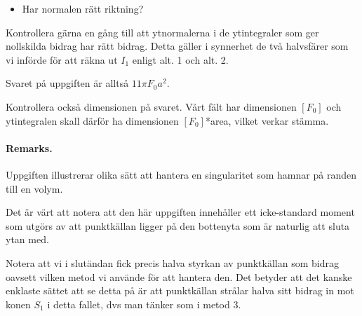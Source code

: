 \documentclass[%
oneside,                 %
final,                   %
10pt]{article}
\newenvironment{doconceexercise}{}{}
\begin{document}
\begin{doconceexercise}
\begin{itemize}
\item Har normalen rätt riktning?
\end{itemize}

\noindent
Kontrollera gärna en gång till att ytnormalerna i de ytintegraler som ger nollskilda bidrag har rätt bidrag. Detta gäller i synnerhet de två halvsfärer som vi införde för att räkna ut $I_1$ enligt alt. 1 och alt. 2.

Svaret på uppgiften är alltså $11\pi F_0 a^2$.

Kontrollera också dimensionen på svaret. Vårt fält har dimensionen $[F_0]$ och ytintegralen skall därför ha dimensionen $[F_0]$*area, vilket verkar stämma.



\paragraph{Remarks.}
Uppgiften illustrerar olika sätt att hantera en singularitet som hamnar på randen till en volym.

Det är värt att notera att den här uppgiften innehåller ett icke-standard moment som utgörs av att punktkällan ligger på den bottenyta som är naturlig att sluta ytan med. 

Notera att vi i slutändan fick precis halva styrkan 
av punktkällan som bidrag oavsett vilken metod vi använde för att hantera den. Det betyder att det kanske enklaste sättet att se detta på är att punktkällan strålar 
halva sitt bidrag in mot konen $S_1$ i detta fallet, dvs man tänker som i 
metod 3.


\end{doconceexercise}



\end{document}
